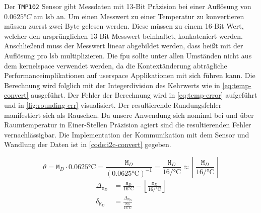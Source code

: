 Der \texttt{TMP102} Sensor gibt Messdaten mit 13-Bit Präzision bei einer Auflösung von $0.0625\si{\degree C}$ am \gls{lsb} an.
Um einen Messwert zu einer Temperatur zu konvertieren müssen zuerst zwei Byte gelesen werden.
Diese müssen zu einem 16-Bit Wert, welcher den ursprünglichen 13-Bit Messwert beinhaltet, konkateniert werden.
Anschlie{\ss}end muss der Messwert linear abgebildet werden, dass hei{\ss}t mit der Auflösung pro \gls{lsb} multiplizieren.
Die \gls{fpu} sollte unter allen Umständen nicht aus dem \gls{kernelspace} verwendet werden,
da die Kontextänderung abträgliche Performanceimplikationen auf \gls{userspace} Applikationen mit sich führen kann.
Die Berechnung wird folglich mit der Integerdivision des Kehrwerts wie in \autoref{eq:temp-convert} ausgeführt.
Der Fehler der Berechnung wird in \autoref{eq:temp-error} aufgeführt und in \autoref{fig:rounding-err} visualisiert.
Der resultierende Rundungsfehler manifestiert sich als Rauschen.
Da unsere Anwendung sich nominal bei und über Raumtemperatur in Einer-Stellen Präzision agiert sind die resultierenden Fehler vernachlässigbar.
Die Implementation der Kommunikation mit dem Sensor und Wandlung der Daten ist in \autoref{code:i2c-convert} gegeben.

\begin{samepage}
\begin{equation}
    \vartheta = \texttt{M}_D \cdot 0.0625\si{\celsius} = \frac{\texttt{M}_D}{\left(0.0625\si{\celsius}\right)^{-1}} = \frac{\texttt{M}_D}{16\si{\per\celsius}} \approx \left\lfloor\frac{\texttt{M}_D}{16\si{\per\celsius}}\right\rfloor
    \label{eq:temp-convert}
\end{equation}
\begin{equation}
    \begin{aligned}
        \Delta_{\texttt{M}_D} &= \frac{\texttt{M}_D}{16\si{\celsius}} - \left\lfloor\frac{\texttt{M}_D}{16\si{\per\celsius}}\right\rfloor \\[2ex]
        \delta_{\texttt{M}_D} &= \frac{\Delta_{\texttt{M}_D}}{\frac{\texttt{M}_D}{16\si{\celsius}} }\\[2ex]
    \end{aligned}
    \label{eq:temp-error}
\end{equation}
\end{samepage}



